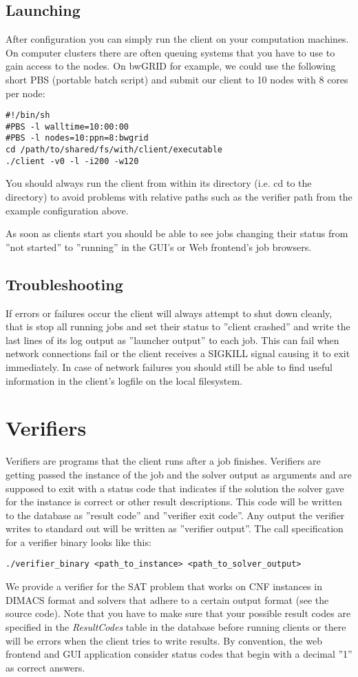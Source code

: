 \documentclass{article}
\begin{document}
\subsection{Launching}
After configuration you can simply run the client on your computation machines. On computer clusters there are often queuing systems that you have to use to gain access to the nodes.
On bwGRID for example, we could use the following short PBS (portable batch script) and submit our client to 10 nodes with 8 cores per node:
\begin{verbatim}
#!/bin/sh
#PBS -l walltime=10:00:00
#PBS -l nodes=10:ppn=8:bwgrid
cd /path/to/shared/fs/with/client/executable
./client -v0 -l -i200 -w120
\end{verbatim}
You should always run the client from within its directory (i.e. cd to the directory) to avoid problems with relative paths such as the verifier path from the example configuration above.

As soon as clients start you should be able to see jobs changing their status from ''not started'' to ''running'' in the GUI's or Web frontend's job browsers.

\subsection{Troubleshooting}
If errors or failures occur the client will always attempt to shut down cleanly, that is stop all running jobs and set their status to ''client crashed'' and write
the last lines of its log output as ''launcher output'' to each job. This can fail when network connections fail or the client receives a SIGKILL signal causing it to exit immediately.
In case of network failures you should still be able to find useful information in the client's logfile on the local filesystem.

\section{Verifiers}
\label{sec:verifiers}
Verifiers are programs that the client runs after a job finishes. Verifiers are getting passed the instance of the job and the solver output as arguments and are supposed to exit with a status code
that indicates if the solution the solver gave for the instance is correct or other result descriptions. This code will be written to the database as ''result code'' and ''verifier exit code''. Any output the verifier writes to standard out will
be written as ''verifier output''. The call specification for a verifier binary looks like this:
\begin{verbatim}
./verifier_binary <path_to_instance> <path_to_solver_output>
\end{verbatim}
We provide a verifier for the SAT problem that works on CNF instances in DIMACS format and solvers that adhere to a certain output format (see the source code). Note that you have to make sure
that your possible result codes are specified in the \textit{ResultCodes} table in the database before running clients or there will be errors when the client tries to write results. By convention,
the web frontend and GUI application consider status codes that begin with a decimal ''1'' as correct answers.
\end{document}

